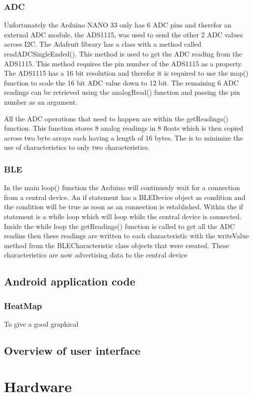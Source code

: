 \subsubsection{ADC} 

Unfortunately the Arduino NANO 33 only has 6 ADC pins and therefor an external ADC module, the ADS1115, was used to send the other 2 ADC values across I2C. The Adafruit library has a class with a method called readADCSingleEnded(). This method is used to get the ADC reading from the ADS1115. This method requires the pin number of the ADS1115 as a property. The ADS1115 has a 16 bit resolution and therefor it is required to use the map() function to scale the 16 bit ADC value down to 12 bit. The remaining 6 ADC readings can be retrieved using the analogRead() function and passing the pin number as an argument.

All the ADC operations that need to happen are within the getReadings() function. This function stores 8 analog readings in 8 floats which is then copied across two byte arrays each having a length of 16 bytes. The is to minimize the use of characteristics to only two characteristics.

\subsubsection{BLE}

In the main loop() function the Arduino will continuesly wait for a connection from a central device. An if statement has a BLEDevice object as condition and the condition will be true as soon as an connection is established. Within the if statement is a while loop which will loop while the central device is connected. Inside the while loop the getReadings() function is called to get all the ADC readins then these readings are written to each characteristic with the writeValue method from the BLECharacteristic class objects that were created. These characteristics are now advertising data to the central device



\subsection{Android application code}

\subsubsection{HeatMap}
To give a good graphical 

\subsection{Overview of user interface}

\section{Hardware}

